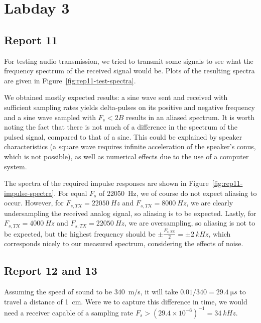 \documentclass[11pt,titlepage]{report}
\begin{document}
\section{Labday 3}
\subsection{Report 11}
For testing audio transmission, we tried to transmit some signals to see what the frequency spectrum of the received signal would be. Plots of the resulting spectra are given in Figure~\ref{fig:rep11-test-spectra}.


We obtained mostly expected results: a sine wave sent and received with sufficient sampling rates yields delta-pulses on its positive and negative frequency and a sine wave sampled with $F_s < 2B$ results in an aliased spectrum. It is worth noting the fact that there is not much of a difference in the spectrum of the pulsed signal, compared to that of a sine. This could be explained by speaker characteristics (a square wave requires infinite acceleration of the speaker's conus, which is not possible), as well as numerical effects due to the use of a computer system.


The spectra of the required impulse responses are shown in Figure~\ref{fig:rep11-impulse-spectra}. For equal $F_s$ of \SI{22050}{Hz}, we of course do not expect aliasing to occur. However, for $F_{s,TX} = \SI{22050}{Hz}$ and $F_{s,TX} = \SI{8000}{Hz}$, we are clearly undersampling the received analog signal, so aliasing is to be expected. Lastly, for $F_{s,TX} = \SI{4000}{Hz}$ and $F_{s,TX} = \SI{22050}{Hz}$, we are oversampling, so aliasing is not to be expected, but the highest frequency should be $\pm \frac{F_{s,TX}}{2} = \pm \SI{2}{kHz}$, which corresponds nicely to our measured spectrum, considering the effects of noise.


\subsection{Report 12 and 13}
Assuming the speed of sound to be \SI{340}{m/s}, it will take $0.01/340 = \SI{29.4}{\micro s}$ to travel a distance of \SI{1}{cm}. Were we to capture this difference in time, we would need a receiver capable of a sampling rate $F_s > (29.4 \times 10^{-6})^{-1} = \SI{34}{kHz}$.
\end{document}
